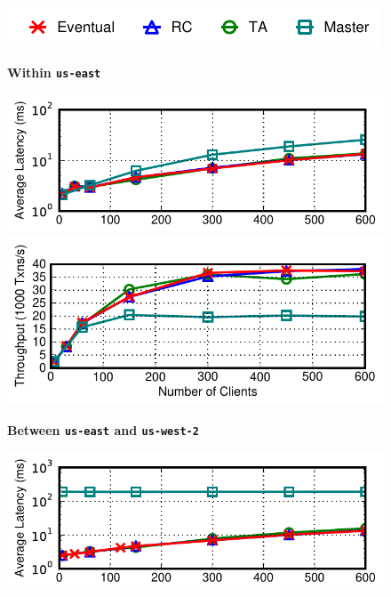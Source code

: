 \begin{figure}[t!]
\begin{center}
\hspace{2em}\includegraphics[width=.8\columnwidth]{figs/strategylegend.pdf}
\end{center}\vspace{-2em}
\begin{center}\textbf{Within \texttt{us-east}}\end{center}\vspace{-1.5em}
\includegraphics[width=\columnwidth]{figs/lan-threads-lats.pdf}\vspace{-1em}
\includegraphics[width=\columnwidth]{figs/lan-threads-thru.pdf}
\begin{center}\textbf{Between \texttt{us-east} and \texttt{us-west-2}}\end{center}\vspace{-1.5em}
\includegraphics[width=\columnwidth]{figs/wan-threads-lats.pdf}\vspace{-1em}

\end{figure}

